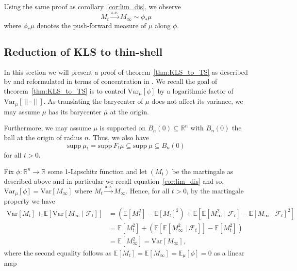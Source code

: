 Using the same proof as corollary~\ref{cor:lim_dis}, we observe 
\begin{equation}\label{eq:lim_mart}
  M_t \xrightarrow{\text{a.e.}} M_\infty \sim \phi_* \mu
\end{equation}
where \(\phi_*\mu\) denotes the push-forward measure of \(\mu\) along \(\phi\).

\subsection{Reduction of KLS to thin-shell}

In this section we will present a proof of theorem~\ref{thm:KLS_to_TS} as described by \cite{Lee_2016} and 
reformulated in terms of concentration in \cite{Eldan_notes}.
We recall the goal of theorem~\ref{thm:KLS_to_TS} is to control \(\text{Var}_\mu[\phi]\) by 
a logarithmic factor of \(\text{Var}_\mu[\|\cdot\|]\). As translating the barycenter of \(\mu\)
does not affect its variance, we may assume \(\mu\) has its barycenter \(\overline{\mu}\) at the origin.

Furthermore,  we may assume \(\mu\) is supported on \(B_n(0) \subseteq \mathbb{R}^n\) with 
\(B_n(0)\) the ball at the origin of radius \(n\). Thus, we also have 
\[\text{supp}\ \mu_t = \text{supp}\ F_t\mu \subseteq \text{supp}\ \mu \subseteq B_n(0)\] 
for all \(t > 0\).
 
Fix \(\phi : \mathbb{R}^n \to \mathbb{R}\) some 1-Lipschitz function and let \((M_t)\) be the 
martingale as described above and in particular we recall equation~\ref{cor:lim_dis} and so, 
\(\text{Var}_\mu[\phi] = \text{Var}[M_\infty]\) where \(M_t \xrightarrow{\text{a.e.}} M_\infty\).
Hence, for all \(t > 0\), by the martingale property we have
\begin{align*}
  \text{Var}[M_t] + \mathbb{E}[\text{Var}[M_\infty \mid \mathscr{F}_t]] 
    & = (\mathbb{E}[M_t^2] - \mathbb{E}[M_t]^2) 
      + \mathbb{E}\left[\mathbb{E}[M_\infty^2 \mid \mathscr{F}_t] - \mathbb{E}[M_\infty \mid \mathscr{F}_t]^2\right]\\
    & = \mathbb{E}[M_t^2] + (\mathbb{E}[\mathbb{E}[M_\infty^2 \mid \mathscr{F}_t]] - \mathbb{E}[M_t^2])\\
    & = \mathbb{E}[M_\infty^2] = \text{Var}[M_\infty],
\end{align*}
where the second equality follows as \(\mathbb{E}[M_t] = \mathbb{E}[M_\infty] = \mathbb{E}_\mu[\phi] = 0\) as 
a linear map 

